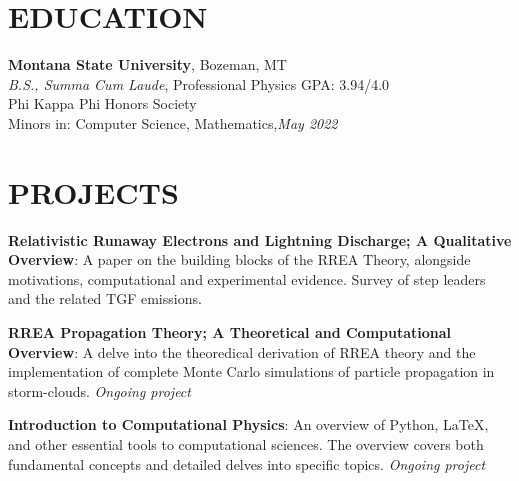 \documentclass[margin]{res}
\begin{document}
\begin{resume}

\section{EDUCATION}
\raggedright
\textbf{Montana State University}, Bozeman, MT\\\vspace{0.5ex}
{\sl B.S., Summa Cum Laude}, Professional Physics \hfill GPA: 3.94/4.0\\
Phi Kappa Phi Honors Society\\
Minors in: Computer Science, Mathematics,\hfill {\sl May 2022}\\



\section{PROJECTS}
\raggedright
\par
\textbf{Relativistic Runaway Electrons and Lightning Discharge; A Qualitative Overview}: 
A paper on the building blocks of the RREA Theory, alongside motivations, computational and experimental evidence. Survey of step leaders and the related TGF emissions.
\par
\textbf{RREA Propagation Theory; A Theoretical and Computational Overview}:
A delve into the theoredical derivation of RREA theory and the implementation of complete Monte Carlo simulations of particle propagation in storm-clouds. \textit{Ongoing project}
\par 
\textbf{Introduction to Computational Physics}:
An overview of Python, \LaTeX , and other essential tools to computational sciences. The overview covers both fundamental concepts and detailed delves into specific topics. \textit{Ongoing project}



\end{resume}
\end{document}
